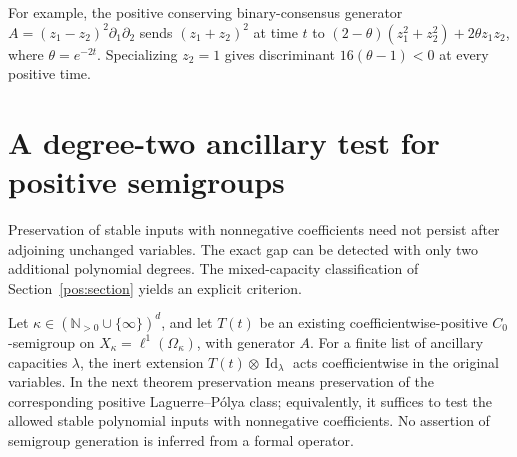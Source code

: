 \documentclass[reqno]{amsart}
\theoremstyle{definition}
\theoremstyle{remark}
\newcommand{\N}{\mathbb N}
\DeclareMathOperator{\Id}{Id}
\begin{document}
For example, the positive conserving binary-consensus generator
\(A=(z_1-z_2)^2\partial_1\partial_2\) sends \((z_1+z_2)^2\) at time \(t\) to
\((2-\theta)(z_1^2+z_2^2)+2\theta z_1z_2\), where \(\theta=e^{-2t}\).
Specializing \(z_2=1\) gives discriminant \(16(\theta-1)<0\) at every
positive time.


\section{A degree-two ancillary test for positive semigroups}
\label{anc:section}


Preservation of stable inputs with nonnegative coefficients need not
persist after adjoining unchanged variables.  The exact gap can be
detected with only two additional polynomial degrees.  The mixed-capacity
classification of Section~\ref{pos:section} yields an explicit criterion.

Let \(\kappa\in(\N_{>0}\cup\{\infty\})^d\), and let \(T(t)\) be an existing
coefficientwise-positive \(C_0\)-semigroup on
\(X_\kappa=\ell^1(\Omega_\kappa)\), with generator \(A\).
For a finite list of ancillary capacities \(\lambda\), the inert extension
\(T(t)\otimes\Id_\lambda\) acts coefficientwise in the original variables.
In the next theorem preservation means preservation of the corresponding
positive Laguerre--P\'olya class; equivalently, it suffices to test the
allowed stable polynomial inputs with nonnegative coefficients.
No assertion of semigroup generation is inferred from a formal operator.
\end{document}
